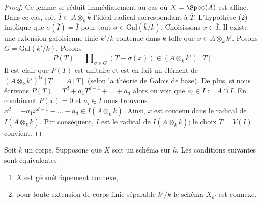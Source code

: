 \begin{proof}
Ce lemme se réduit immédiatement au cas où $X = \Spec(A)$
est affine. Dans ce cas, soit $\overline{I} \subset A
\otimes_k \overline{k}$ l'idéal radical correspondant à
$\overline{T}$. L'hypothèse (2) implique que
$\sigma(\overline{I}) = \overline{I}$ pour tout $\sigma \in
\text{Gal}(\overline{k}/k)$. Choisissons $x \in \overline{I}$. Il
existe une extension galoisienne finie $k'/k$ contenue dans
$\overline{k}$ telle que $x \in A \otimes_k k'$. Posons $G = \text{Gal}(k'/k)$. Posons
$$
P(T) = \prod\nolimits_{\sigma \in G} (T - \sigma(x)) \in (A \otimes_k k')[T]
$$
Il est clair que $P(T)$ est unitaire et est en fait un élément
de $(A \otimes_k k')^G[T] = A[T]$ (selon la théorie de Galois de
base). De plus, si nous écrivons $P(T) = T^d + a_1T^{d - 1} +
\ldots + a_d$ alors on voit que $a_i \in I := A \cap
\overline{I}$. En combinant $P(x) = 0$ et $a_i \in I$ nous
trouvons $x^d = - a_1 x^{d - 1} - \ldots - a_d \in I(A \otimes_k
\overline{k})$. Ainsi, $x$ est contenu dans le radical de $I(A
\otimes_k \overline{k})$. Par conséquent, $\overline{I}$ est le radical
de $I(A \otimes_k \overline{k})$; le choix $T = V(I)$ convient.
\end{proof}

\begin{lemma}
\label{lemma-characterize-geometrically-disconnected}
Soit $k$ un corps.
Supposons que $X$ soit un schéma sur
$k$. Les conditions suivantes sont équivalentes
\begin{enumerate}
\item $X$ est géométriquement connexe,
\item pour toute extension de corps finie
séparable $k'/k$ le schéma $X_{k'}$ est connexe.
\end{enumerate}
\end{lemma}

